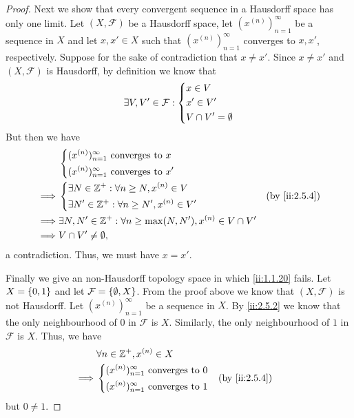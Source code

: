 \begin{proof}
  Next we show that every convergent sequence in a Hausdorff space has only one limit.
  Let \((X, \mathcal{F})\) be a Hausdorff space, let \((x^{(n)})_{n = 1}^\infty\) be a sequence in \(X\) and let \(x, x' \in X\) such that \((x^{(n)})_{n = 1}^\infty\) converges to \(x, x'\), respectively.
  Suppose for the sake of contradiction that \(x \neq x'\).
  Since \(x \neq x'\) and \((X, \mathcal{F})\) is Hausdorff, by definition we know that
  \[
    \exists V, V' \in \mathcal{F} : \begin{dcases}
      x \in V   \\
      x' \in V' \\
      V \cap V' = \emptyset
    \end{dcases}
  \]
  But then we have
  \begin{align*}
             & \begin{dcases}
                 (x^{(n)})_{n = 1}^\infty \text{ converges to } x \\
                 (x^{(n)})_{n = 1}^\infty \text{ converges to } x'
               \end{dcases}                           \\
    \implies & \begin{dcases}
                 \exists N \in \Z^+ : \forall n \geq N, x^{(n)} \in V \\
                 \exists N' \in \Z^+ : \forall n \geq N', x^{(n)} \in V'
               \end{dcases}                    &  & \by{ii:2.5.4}                     \\
    \implies & \exists N, N' \in \Z^+ : \forall n \geq \max(N, N'), x^{(n)} \in V \cap V' \\
    \implies & V \cap V' \neq \emptyset,
  \end{align*}
  a contradiction.
  Thus, we must have \(x = x'\).

  Finally we give an non-Hausdorff topology space in which \cref{ii:1.1.20} fails.
  Let \(X = \left\lbrace0, 1\right\rbrace\) and let \(\mathcal{F} = \left\lbrace\emptyset, X\right\rbrace\).
  From the proof above we know that \((X, \mathcal{F})\) is not Hausdorff.
  Let \((x^{(n)})_{n = 1}^\infty\) be a sequence in \(X\).
  By \cref{ii:2.5.2} we know that the only neighbourhood of \(0\) in \(\mathcal{F}\) is \(X\).
  Similarly, the only neighbourhood of \(1\) in \(\mathcal{F}\) is \(X\).
  Thus, we have
  \begin{align*}
             & \forall n \in \Z^+, x^{(n)} \in X                \\
    \implies & \begin{dcases}
                 (x^{(n)})_{n = 1}^\infty \text{ converges to } 0 \\
                 (x^{(n)})_{n = 1}^\infty \text{ converges to } 1
               \end{dcases} &  & \by{ii:2.5.4}
  \end{align*}
  but \(0 \neq 1\).
\end{proof}

